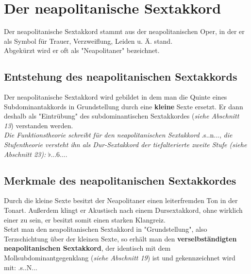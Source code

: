 \documentclass[a4paper]{article}
\newcommand{\dSS}[1]{\HH.\uppercase\expandafter{\romannumeral #1\relax}..6...} %
\newcommand{\Shochm}[2]{\HH.s.#2.#1...}
\begin{document}
	\section{Der neapolitanische Sextakkord}
	Der neapolitanische Sextakkord stammt aus der neapolitanischen Oper, in der er als Symbol für Trauer, Verzweiflung, Leiden u. Ä. stand.\\
	Abgekürzt wird er oft als "Neapolitaner" bezeichnet.
	
	\subsection{Entstehung des neapolitanischen Sextakkords}
	Der neapolitanische Sextakkord wird gebildet in dem man die Quinte eines Subdominantakkords in Grundstellung durch eine \textbf{kleine} Sexte ersetzt. Er dann deshalb als "{}Eintrübung" des subdominantischen Sextakkordes (\textit{siehe Abschnitt 13}) verstanden werden.\\
	\textit{Die Funktionstheorie schreibt für den neapolitanischen Sextakkord} \Shochm{n}{}, \textit{die Stufentheorie versteht ihn als Dur-Sextakkord der tiefalterierte zweite Stufe (siehe Abschnitt 23):} $\flat$\dSS{2}.
	
	\subsection{Merkmale des neapolitanischen Sextakkordes}
	Durch die kleine Sexte besitzt der Neapolitaner einen leiterfremden Ton in der Tonart. Außerdem klingt er Akustisch nach einem Dursextakkord, ohne wirklich einer zu sein, er besitzt somit einen starken Klangreiz.\\
	Setzt man den neapolitanischen Sextakkord in "Grundstellung", also Terzschichtung über der kleinen Sexte, so erhält man den \textbf{verselbständigten neapolitanischen Sextakkord}, der identisch mit dem Mollsubdominantgegenklang (\textit{siehe Abschnitt 19}) ist und gekennzeichnet wird mit: \Shochm{N}{}
	
\end{document}
